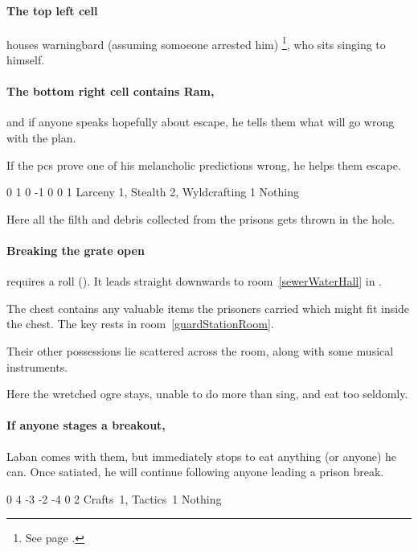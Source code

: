 
\paragraph{The top left cell}
houses \gls{warningbard} (assuming somoeone arrested him)%
\footnote{See page \pageref{warningbard}.},
who sits singing to himself.

\paragraph{The bottom right cell contains Ram,}
and if anyone speaks hopefully about escape, he tells them what will go wrong with the plan.

If the \glspl{pc} prove one of his melancholic predictions wrong, he helps them escape.

{0}%
{1}%
{{0}%
{-1}%
{0}}%
{0}%
{1}%
{Larceny 1, Stealth 2, Wyldcrafting 1}%
{Nothing}%
{}


Here all the filth and debris collected from the prisons gets thrown in the hole.

\paragraph{Breaking the grate open}
requires a  roll (\tn[10]).
It leads straight downwards to room~\vref{sewerWaterHall} in .


The chest contains any valuable items the prisoners carried which might fit inside the chest.
The key rests in room~\ref{guardStationRoom}.

Their other possessions lie scattered across the room, along with some musical instruments.


Here the wretched ogre stays, unable to do more than sing, and eat too seldomly.

\paragraph{If anyone stages a breakout,}
Laban comes with them, but immediately stops to eat anything (or anyone) he can.
Once satiated, he will continue following anyone leading a prison break.


  {0}%
  {4}%
  {{-3}%
  {-2}%
  {-4}}%
  {0}%
  {2}%
  {Crafts~1, Tactics~1}%
  {Nothing}%
  {}
